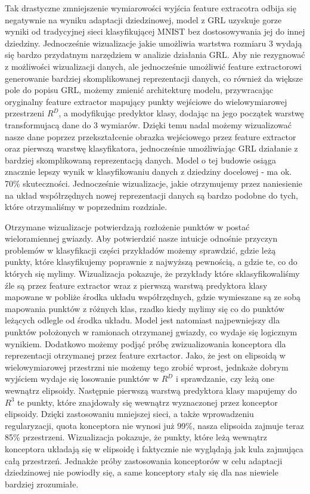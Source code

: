\documentclass{article}
\begin{document}
Tak drastyczne zmniejszenie wymiarowości wyjścia feature extracotra odbija się negatywnie na wyniku adaptacji dziedzinowej, model z GRL uzyskuje gorze wyniki od tradycyjnej sieci klasyfikującej MNIST bez dostosowywania jej do innej dziedziny. Jednocześnie wizualizacje jakie umożliwia wartstwa rozmiaru 3 wydają się bardzo przydatnym narzędziem w analizie działania GRL. Aby nie rezygnować z możliwości wizualizacji danych, ale jednocześnie umożliwić feature extractorowi generowanie bardziej skomplikowanej reprezentacji danych, co również da większe pole do popisu GRL, możemy zmienić architekturę modelu, przywracając oryginalny feature extractor mapujący punkty wejściowe do wielowymiarowej przestrzeni $R^{D}$, a modyfikując predyktor klasy, dodając na jego początek warstwę transformujacą dane do 3 wymiarów. Dzięki temu nadal możemy wizualizować nasze dane poprzez przekształcenie obrazka wejściowego przez feature extractor oraz pierwszą warstwę klasyfikatora, jednocześnie umożliwiając GRL działanie z bardziej skomplikowaną reprezentacją danych. Model o tej budowie osiąga znacznie lepszy wynik w klasyfikowaniu danych z dziedziny docelowej - ma ok. 70\% skuteczności. Jednocześnie wizualizacje, jakie otrzymujemy przez naniesienie na układ współrzędnych nowej reprezentacji danych są bardzo podobne do tych, które otrzymaliśmy w poprzednim rozdziale.
\par
Otrzymane wizualizacje potwierdzają rozłożenie punktów w postać wieloramiennej gwiazdy. Aby potwierdzić nasze intuicje odnośnie przyczyn problemów w klasyfikacji części przykładów możemy sprawdzić, gdzie leżą punkty, które klasyfikujemy poprawnie z najwyższą pewnością, a gdzie te, co do których się mylimy. Wizualizacja pokazuje, że przykłady które sklasyfikowaliśmy źle są przez feature extractor wraz z pierwszą warstwą predyktora klasy mapowane w pobliże środka układu współrzędnych, gdzie wymieszane są ze sobą mapowania punktów z różnych klas, rzadko kiedy mylimy się co do punktów leżących odlegle od środka układu. Model jest natomiast najpewniejszy dla punktów położonych w ramionach otrzymanej gwiazdy, co wydaje się logicznym wynikiem. Dodatkowo możemy podjąć próbę zwizualizowania konceptora dla reprezentacji otrzymanej przez feature exrtactor. Jako, że jest on elipsoidą w wielowymiarowej przestrzni nie możemy tego zrobić wprost, jednkaże dobrym wyjściem wydaje się losowanie punktów w $R^{D}$ i sprawdzanie, czy leżą one wewnątrz elipsoidy. Następnie pierwszą warstwą predyktora klasy mapujemy do $R^{3}$ te punkty, które znajdowały się wewnątrz wyznaczonej przez konceptor elipsoidy. Dzięki zastosowaniu mniejszej sieci, a także wprowadzeniu regularyzacji, quota konceptora nie wynosi już 99\%, nasza elipsoida zajmuje teraz 85\% przestrzeni. Wizualizacja pokazuje, że punkty, które leżą wewnątrz konceptora układają się w elipsoidę i faktycznie nie wyglądają jak kula zajmująca całą przestrzeń. Jednakże próby zastosowania konceptorów w celu adaptacji dziedzinowej nie powiodły się, a same konceptory stały się dla nas niewiele bardziej zrozumiałe.
\end{document}

